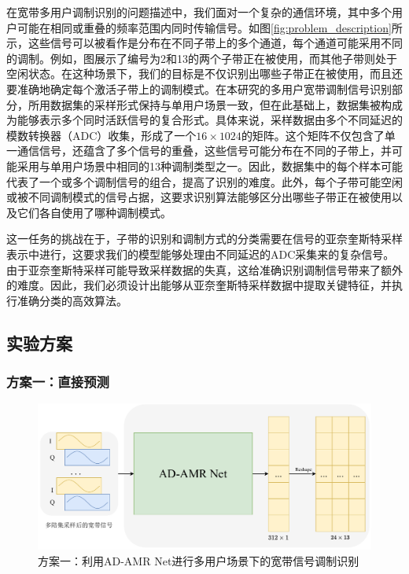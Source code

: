 在宽带多用户调制识别的问题描述中，我们面对一个复杂的通信环境，其中多个用户可能在相同或重叠的频率范围内同时传输信号。如图\ref{fig:problem_description}所示，这些信号可以被看作是分布在不同子带上的多个通道，每个通道可能采用不同的调制。例如，图展示了编号为2和13的两个子带正在被使用，而其他子带则处于空闲状态。在这种场景下，我们的目标是不仅识别出哪些子带正在被使用，而且还要准确地确定每个激活子带上的调制模式。在本研究的多用户宽带调制信号识别部分，所用数据集的采样形式保持与单用户场景一致，但在此基础上，数据集被构成为能够表示多个同时活跃信号的复合形式。具体来说，采样数据由多个不同延迟的模数转换器（ADC）收集，形成了一个$16 \times 1024$的矩阵。这个矩阵不仅包含了单一通信信号，还蕴含了多个信号的重叠，这些信号可能分布在不同的子带上，并可能采用与单用户场景中相同的13种调制类型之一。因此，数据集中的每个样本可能代表了一个或多个调制信号的组合，提高了识别的难度。此外，每个子带可能空闲或被不同调制模式的信号占据，这要求识别算法能够区分出哪些子带正在被使用以及它们各自使用了哪种调制模式。

这一任务的挑战在于，子带的识别和调制方式的分类需要在信号的亚奈奎斯特采样表示中进行，这要求我们的模型能够处理由不同延迟的ADC采集来的复杂信号。由于亚奈奎斯特采样可能导致采样数据的失真，这给准确识别调制信号带来了额外的难度。因此，我们必须设计出能够从亚奈奎斯特采样数据中提取关键特征，并执行准确分类的高效算法。

\subsection{实验方案}\label{sec:background}

\subsubsection{方案一：直接预测}\label{sec:background}

\begin{figure}
    \centering
    \includegraphics[width=\textwidth]{Image/plana.pdf}
    \caption{方案一：利用AD-AMR Net进行多用户场景下的宽带信号调制识别}
    \label{fig:plana}
\end{figure}

